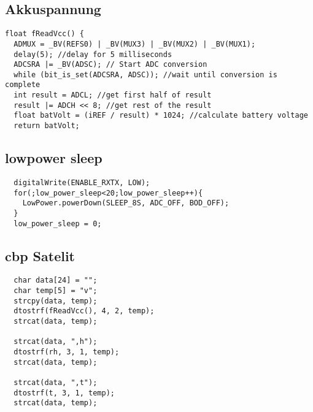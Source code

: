 \subsection{Akkuspannung}
\label{satelit spannung}
\begin{verbatim}
float fReadVcc() {
  ADMUX = _BV(REFS0) | _BV(MUX3) | _BV(MUX2) | _BV(MUX1);
  delay(5); //delay for 5 milliseconds
  ADCSRA |= _BV(ADSC); // Start ADC conversion
  while (bit_is_set(ADCSRA, ADSC)); //wait until conversion is complete
  int result = ADCL; //get first half of result
  result |= ADCH << 8; //get rest of the result
  float batVolt = (iREF / result) * 1024; //calculate battery voltage
  return batVolt;
\end{verbatim}
\subsection{lowpower sleep}
\label{lowpowersleep}
\begin{verbatim}
  digitalWrite(ENABLE_RXTX, LOW);
  for(;low_power_sleep<20;low_power_sleep++){
    LowPower.powerDown(SLEEP_8S, ADC_OFF, BOD_OFF);
  }
  low_power_sleep = 0;
\end{verbatim}
\subsection{cbp Satelit}
\label{cbp satelit}
\begin{verbatim}
  char data[24] = "";
  char temp[5] = "v";
  strcpy(data, temp);
  dtostrf(fReadVcc(), 4, 2, temp);
  strcat(data, temp);

  strcat(data, ",h");
  dtostrf(rh, 3, 1, temp);
  strcat(data, temp);

  strcat(data, ",t");
  dtostrf(t, 3, 1, temp);
  strcat(data, temp);  
\end{verbatim}